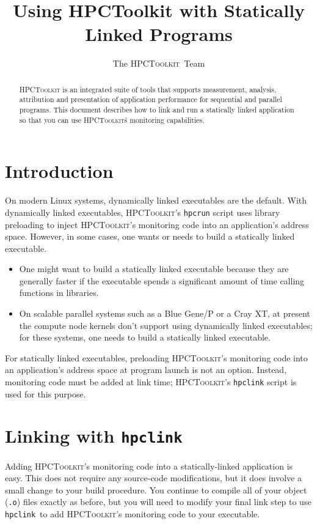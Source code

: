 \documentclass[12pt]{article}
\newcommand{\HPCToolkit}{\textsc{HPCToolkit}}
\newcommand{\hpcrun}{\texttt{hpcrun}}
\newcommand{\hpclink}{\texttt{hpclink}}
\begin{document}
\title{Using {\sc HPCToolkit} with Statically Linked Programs}
\author{The \HPCToolkit\ Team}
\maketitle

\begin{abstract}
\HPCToolkit{} is an integrated suite of tools that supports
measurement, analysis, attribution and presentation of application
performance for sequential and parallel programs.  This document
describes how to link and run a statically linked application so that you can use
 \HPCToolkit\'s monitoring capabilities. 
 \end{abstract}

\section{Introduction}
On modern Linux systems, dynamically linked executables are the default. With dynamically linked executables, \HPCToolkit's \hpcrun{} script uses  library preloading
 to inject \HPCToolkit's monitoring code into an application's address space. 
However, in some cases, one wants or needs to build a statically linked executable. 
\begin{itemize}
\item One might want to build a statically linked executable because they are generally faster if the executable spends a significant amount of time calling functions in libraries. 
\item On scalable parallel systems such as a Blue Gene/P or a Cray XT, at present the compute node kernels don't support using dynamically linked executables; for these systems, one needs to build a statically linked executable.
\end{itemize}

For statically linked executables, preloading \HPCToolkit's monitoring code into an application's address space at program launch is not an option. Instead, monitoring code must be added at link time; \HPCToolkit{}'s \hpclink{} script is used for this purpose.

\section{Linking with \hpclink }

Adding \HPCToolkit's monitoring
code into a statically-linked application is easy.  This does not require any
source-code modifications, but it does involve a small change to your
build procedure.  You continue to compile
all of your object ({\tt .o}) files exactly as before, but you will need to 
modify your final link step
to use \hpclink\ to add  \HPCToolkit's monitoring code to your executable.
\end{document}
